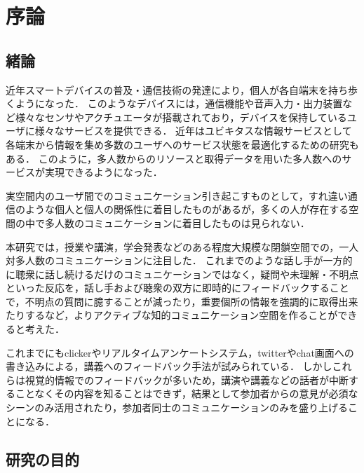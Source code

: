 \chapter{序論}
\pagestyle{fancy}

\section{緒論}





近年スマートデバイスの普及・通信技術の発達により，個人が各自端末を持ち歩くようになった．
このようなデバイスには，通信機能や音声入力・出力装置など様々なセンサやアクチュエータが搭載されており，デバイスを保持しているユーザに様々なサービスを提供できる．
近年はユビキタスな情報サービスとして各端末から情報を集め多数のユーザへのサービス状態を最適化するための研究もある\cite{11ubi, 辻賢太郎}．
このように，多人数からのリソースと取得データを用いた多人数へのサービスが実現できるようになった．


実空間内のユーザ間でのコミュニケーション引き起こすものとして，すれ違い通信\cite{surechigai}のような個人と個人の関係性に着目したものがあるが，多くの人が存在する空間の中で多人数のコミュニケーションに着目したものは見られない．

本研究では，授業や講演，学会発表などのある程度大規模な閉鎖空間での，一人対多人数のコミュニケーションに注目した．
これまでのような話し手が一方的に聴衆に話し続けるだけのコミュニケーションではなく，疑問や未理解・不明点といった反応を，話し手および聴衆の双方に即時的にフィードバックすることで，不明点の質問に臆することが減ったり，重要個所の情報を強調的に取得出来たりするなど，よりアクティブな知的コミュニケーション空間を作ることができると考えた．

これまでにもclicker\cite{clicker}やリアルタイムアンケートシステム\cite{imakiku}，twitterやchat画面への書き込みによる\cite{twitter}，講義へのフィードバック手法が試みられている．
しかしこれらは視覚的情報でのフィードバックが多いため，講演や講義などの話者が中断することなくその内容を知ることはできず，結果として参加者からの意見が必須なシーンのみ活用されたり，参加者同士のコミュニケーションのみを盛り上げることになる．


\section{研究の目的}

